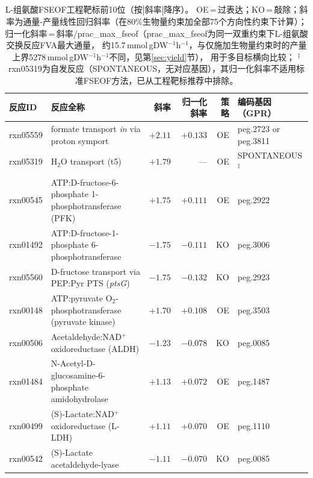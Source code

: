 \documentclass[10pt, a4paper, twocolumn]{ctexart}
\newcommand{\mmolg}{mmol\,gDW$^{-1}$h$^{-1}$}
\begin{document}
\begin{table}[h!]
\caption{L-组氨酸FSEOF工程靶标前10位（按$|\text{斜率}|$降序）。
  OE\,=\,过表达；KO\,=\,敲除；斜率为通量-产量线性回归斜率（在80\%生物量约束加全部75个方向性约束下计算）；
  归一化斜率\,=\,斜率/prac\_max\_fseof（prac\_max\_fseof为同一双重约束下L-组氨酸交换反应FVA最大通量，
  约15.7\,\mmolg{}，与仅施加生物量约束时的产量上界5278\,\mmolg{}不同，见第\ref{sec:yield}节），
  用于多目标横向比较；
  $^\ddagger$rxn05319为自发反应（SPONTANEOUS，无对应基因），其归一化斜率不适用标准FSEOF方法，已从工程靶标推荐中排除。}
\label{tab:fseof}
\small
\centering
\begin{tabular}{llrrrl}
\toprule
\textbf{反应ID} & \textbf{反应全称} & \textbf{斜率} & \textbf{归一化斜率} & \textbf{策略} & \textbf{编码基因（GPR）} \\
\midrule
rxn05559 & formate transport \textit{in} via proton symport              & $+2.11$ & $+0.133$ & OE & peg.2723 or peg.3811 \\
rxn05319 & H$_2$O transport (t5)                                         & $+1.79$ & —        & OE & SPONTANEOUS$^\ddagger$ \\
rxn00545 & ATP:D-fructose-6-phosphate 1-phosphotransferase (PFK)         & $+1.75$ & $+0.111$ & OE & peg.2922 \\
rxn01492 & ATP:D-fructose-1-phosphate 6-phosphotransferase               & $-1.75$ & $-0.111$ & KO & peg.3006 \\
rxn05560 & D-fructose transport via PEP:Pyr PTS (\textit{ptsG})          & $-1.75$ & $-0.132$ & KO & peg.2923 \\
rxn00148 & ATP:pyruvate O$_2$-phosphotransferase (pyruvate kinase)       & $+1.70$ & $+0.108$ & OE & peg.3503 \\
rxn00506 & Acetaldehyde:NAD$^+$ oxidoreductase (ALDH)                   & $-1.23$ & $-0.078$ & KO & peg.0085 \\
rxn01484 & N-Acetyl-D-glucosamine-6-phosphate amidohydrolase             & $+1.13$ & $+0.072$ & OE & peg.1487 \\
rxn00499 & (S)-Lactate:NAD$^+$ oxidoreductase (L-LDH)                   & $+1.11$ & $+0.070$ & OE & peg.1110 \\
rxn00542 & (S)-Lactate acetaldehyde-lyase                                & $-1.11$ & $-0.070$ & KO & peg.0085 \\
\bottomrule
\end{tabular}
\end{table}
\end{document}
